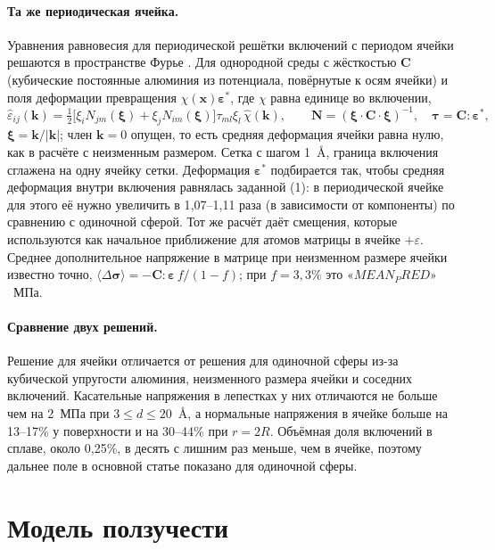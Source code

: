 \documentclass[11pt,a4paper]{article}
\begin{document}
\paragraph{Та же периодическая ячейка.} Уравнения равновесия
для периодической решётки включений с периодом ячейки решаются в пространстве
Фурье \cite{MoulinecSuquet1998}. Для однородной среды с жёсткостью
$\mathbf C$ (кубические постоянные алюминия из потенциала, повёрнутые
к осям ячейки) и поля деформации превращения $\chi(\mathbf x)
\boldsymbol\varepsilon^*$, где $\chi$ равна единице во включении,
\begin{equation}
\hat\varepsilon_{ij}(\mathbf k)=\tfrac12\bigl[\xi_iN_{jm}(\boldsymbol\xi)
+\xi_jN_{im}(\boldsymbol\xi)\bigr]\tau_{ml}\xi_l\,\hat\chi(\mathbf k),
\qquad \mathbf N=(\boldsymbol\xi\cdot\mathbf C\cdot\boldsymbol\xi)^{-1},
\quad \boldsymbol\tau=\mathbf C:\boldsymbol\varepsilon^*,
\end{equation}
$\boldsymbol\xi=\mathbf k/|\mathbf k|$; член $\mathbf k=0$ опущен, то есть
средняя деформация ячейки равна нулю, как в расчёте с неизменным размером.
Сетка с шагом 1~\AA{}, граница включения сглажена на одну ячейку сетки.
Деформация $\boldsymbol\varepsilon^*$ подбирается так, чтобы средняя
деформация внутри включения равнялась заданной (1): в периодической ячейке
для этого её нужно увеличить в 1{,}07--1{,}11 раза (в зависимости
от компоненты) по сравнению с одиночной сферой.
Тот же расчёт даёт смещения, которые используются как начальное
приближение для атомов матрицы в ячейке $+\varepsilon$. Среднее
дополнительное напряжение в матрице при неизменном размере ячейки известно
точно, $\langle\Delta\boldsymbol\sigma\rangle=-\mathbf C:\boldsymbol\varepsilon\,
f/(1-f)$; при $f=3{,}3\%$ это $«MEAN_PRED»$~МПа.

\paragraph{Сравнение двух решений.} Решение для ячейки отличается от
решения для одиночной сферы из-за кубической упругости алюминия,
неизменного размера ячейки и соседних включений. Касательные напряжения
в лепестках у них отличаются не больше чем на 2~МПа при
$3\le d\le20$~\AA, а нормальные напряжения в ячейке больше на 13--17\%
у поверхности и на 30--44\% при $r=2R$. Объёмная доля включений в сплаве,
около 0{,}25\%, в десять с лишним раз меньше, чем в ячейке, поэтому
дальнее поле в основной статье показано для одиночной сферы.

\section{Модель ползучести}
\end{document}
